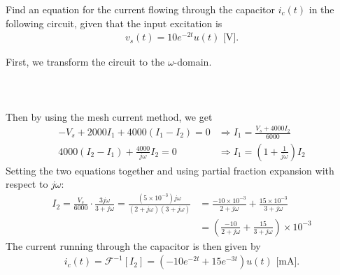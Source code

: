 \documentclass{report}
\begin{document}
\begin{example}
    Find an equation for the current flowing through the capacitor $i_c(t)$ in the following circuit, given that the input excitation is 
    \begin{align*}
        v_s(t) = 10e^{-2t}u(t) \text{ [V]}.
    \end{align*}
\end{example}
\begin{solution}
    First, we transform the circuit to the $\omega$-domain. \\ \\
    \\ \\
    Then by using the mesh current method, we get 
    \begin{align*}
        -V_s + 2000I_1 + 4000(I_1-I_2) = 0 &\Longrightarrow I_1 = \frac{V_s + 4000I_2}{6000} \\
        4000(I_2-I_1) + \frac{4000}{j\omega}I_2 = 0 &\Longrightarrow I_1 = \left(1+\frac{1}{j\omega}\right)I_2
    \end{align*}
    Setting the two equations together and using partial fraction expansion with respect to $j\omega$:
    \begin{align*}
        I_2 = \frac{V_s}{6000}\cdot\frac{3j\omega}{3+j\omega} = \frac{(5\times10^{-3})j\omega}{(2+j\omega)(3+j\omega)} &= \frac{-10\times10^{-3}}{2+j\omega} + \frac{15\times10^{-3}}{3+j\omega} \\ 
        &= \left(\frac{-10}{2+j\omega} + \frac{15}{3+j\omega}\right)\times 10^{-3}
    \end{align*}
    The current running through the capacitor is then given by 
    \begin{align*}
        i_c(t) = \mathcal{F}^{-1}[I_2] = (-10e^{-2t} + 15e^{-3t})u(t) \text{ [mA]}.
    \end{align*}
\end{solution}
\end{document}

